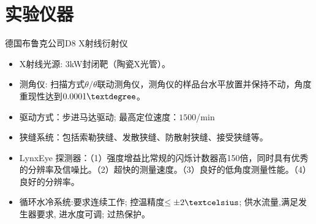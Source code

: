 \documentclass[a4paper]{article}
\begin{document}
\section{实验仪器}
德国布鲁克公司D8 X射线衍射仪
\begin{itemize}
	\item X射线光源: 3kW封闭靶（陶瓷X光管）。
	\item 测角仪: 扫描方式$ \theta/\theta $联动测角仪，测角仪的样品台水平放置并保持不动，角度重现性达到$ 0.0001\textdegree $。
	\item 驱动方式：步进马达驱动; 最高定位速度：$ 1500 $\textdegree/min
	\item 狭缝系统：包括索勒狭缝、发散狭缝、防散射狭缝、接受狭缝等。
	\item LynxEye 探测器：（1）强度增益比常规的闪烁计数器高150倍，同时具有优秀的分辨率及信噪比。（2）超快的测量速度。（3）良好的低角度测量性能。（4）良好的分辨率。
	\item 循环水冷系统:要求连续工作; 控温精度$ \leq \pm 2\textcelsius $; 供水流量,满足发生器要求, 进水度可调; 过热保护。
\end{itemize}
\end{document}
